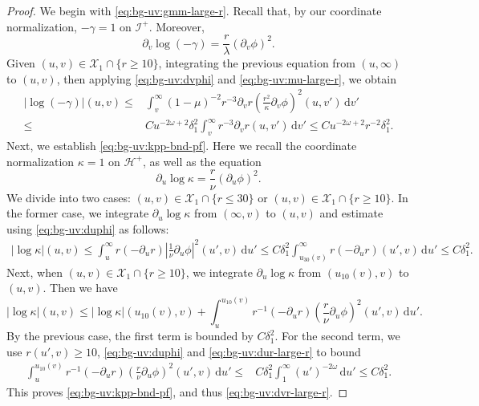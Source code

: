 \documentclass[10pt, reqno]{amsart}
\theoremstyle{definition}
\theoremstyle{remark}
\theoremstyle{conjecture}
\numberwithin{equation}{section}
\newcommand{\abs}[1]{\vert#1\vert}
\newcommand{\set}[1]{\{#1\}}
\newcommand{\ud}{\mathrm{d}}
\newcommand{\rd}{\partial}
\newcommand{\0}{\emptyset}
\newcommand{\gmm}{\gamma}
\newcommand{\dlt}{\delta}
\newcommand{\kpp}{\kappa}
\newcommand{\lmb}{\lambda}
\newcommand{\omg}{\omega}
\newcommand{\calH}{\mathcal H}
\newcommand{\calI}{\mathcal I}
\newcommand{\calX}{\mathcal X}
\newcommand{\dur}{\nu}
\newcommand{\dvr}{\lmb}
\newcommand{\EH}{\calH^{+}}
\newcommand{\NI}{\calI^{+}}						%
\newcommand{\Abs}[1]{\left\vert #1 \right\vert}
\begin{document}
\begin{proof}
We begin with \eqref{eq:bg-uv:gmm-large-r}. Recall that, by our coordinate normalization, $-\gmm = 1$ on $\NI$. Moreover,
\begin{equation*}
	\rd_{v} \log (-\gmm) = \frac{r}{\dvr} (\rd_{v} \phi)^{2}.
\end{equation*}
Given $(u, v) \in \calX_{1} \cap \set{r \geq 10}$, integrating the previous equation from $(u, \infty)$ to $(u, v)$, then applying \eqref{eq:bg-uv:dvphi} and \eqref{eq:bg-uv:mu-large-r}, we obtain
\begin{align*}
	\abs{\log (-\gmm)}(u, v)
	\leq & \int_{v}^{\infty} (1-\mu)^{-2} r^{-3} \rd_{v} r \left(\frac{r^{2}}{\kpp} \rd_{v} \phi \right)^{2}(u, v') \, \ud v'  \\
	\leq & C u^{-2 \omg + 2} \dlt_{1}^{2} \int_{v}^{\infty} r^{-3} \rd_{v} r(u, v') \, \ud v' 
	\leq  C u^{-2 \omg + 2} r^{-2} \dlt_{1}^{2}.
\end{align*}
Next, we establish \eqref{eq:bg-uv:kpp-bnd-pf}. 
Here we recall the coordinate normalization $\kpp = 1$ on $\EH$, as well as the equation 
\begin{equation*}
	\rd_{u} \log \kpp = \frac{r}{\dur} (\rd_{u} \phi)^{2}.
\end{equation*}
We divide into two cases: $(u, v) \in \calX_{1} \cap \set{r \leq 30}$ or  $(u, v) \in \calX_{1} \cap \set{r \geq 10}$. In the former case, we integrate $\rd_{u} \log \kpp$ from $(\infty, v)$ to $(u, v)$ and estimate using \eqref{eq:bg-uv:duphi} as follows:
\begin{align*}
	\abs{\log \kpp}(u, v)
	\leq \int_{u}^{\infty} r (-\rd_{u} r) \Abs{\frac{1}{\dur} \rd_{u} \phi}^{2} (u', v) \, \ud u'
	\leq C \dlt_{1}^{2} \int_{u_{30}(v)}^{\infty} r (-\rd_{u} r) (u', v) \, \ud u' 
	\leq C \dlt_{1}^{2}.
\end{align*}
Next, when $(u, v) \in \calX_{1} \cap \set{r \geq 10}$, we integrate $\rd_{u} \log \kpp$ from $(u_{10}(v), v)$ to $(u, v)$. Then we have
\begin{equation*}
	\abs{\log \kpp}(u, v)
	\leq \abs{\log \kpp}(u_{10}(v), v)
	+ \int_{u}^{u_{10}(v)} r^{-1} (-\rd_{u} r) \left(\frac{r}{\dur} \rd_{u} \phi \right)^{2}(u', v) \, \ud u'.
\end{equation*}
By the previous case, the first term is bounded by $C \dlt_{1}^{2}$. For the second term, we use $r(u', v) \geq 10$, \eqref{eq:bg-uv:duphi} and \eqref{eq:bg-uv:dur-large-r} to bound
\begin{align*}
\int_{u}^{u_{10}(v)} r^{-1} (-\rd_{u} r) \left(\frac{r}{\dur} \rd_{u} \phi \right)^{2}(u', v) \, \ud u'
\leq & C \dlt_{1}^{2} \int_{1}^{\infty} (u')^{-2 \omg} \, \ud u' 
\leq C \dlt_{1}^{2}.
\end{align*}
This proves \eqref{eq:bg-uv:kpp-bnd-pf}, and thus \eqref{eq:bg-uv:dvr-large-r}.


\end{proof}
\end{document}
